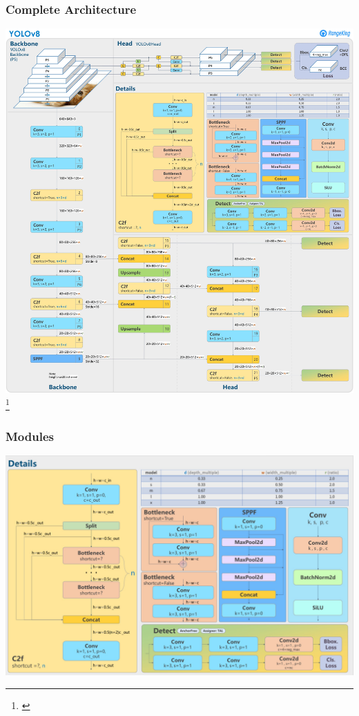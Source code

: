 \documentclass[serif]{beamer}  %
\begin{document}
\begin{frame}
\frametitle{Complete Architecture}
\centering
\includegraphics[height=0.85\textheight,keepaspectratio]{images/YOLO_architecture.jpg}
\footnote{\cite{rangeking2023yolov8}}
\end{frame}

\begin{frame}
\frametitle{Modules}
\centering
\includegraphics[width=1\linewidth,keepaspectratio]{images/module_details.png}
\end{frame}
\end{document}
